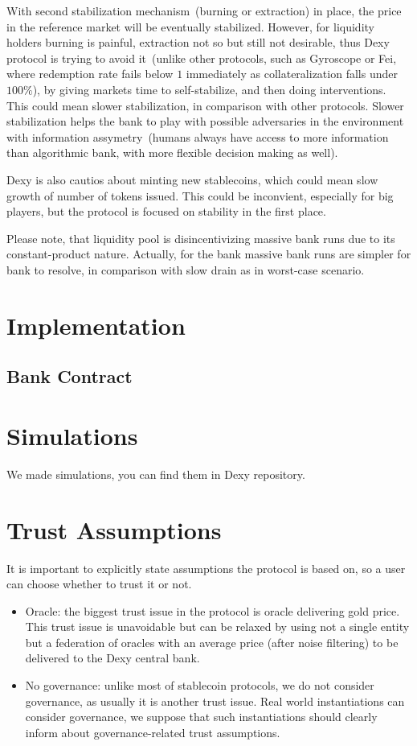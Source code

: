 \documentclass{article}   %
\newcommand{\authnote}[2]{\marginpar{\parbox{\marginparwidth}{\tiny %
  \textsf{#1 {\textcolor{blue}{notes: #2}}}}}%
  \textcolor{blue}{\textbf{\dag}}}
\newcommand{\authnote}[2]{
  \textsf{#1 \textcolor{blue}{: #2}}}
\newcommand{\authnote}[2]{}
\newcommand{\knote}[1]{{\authnote{\textcolor{green}{Alex notes}}{#1}}}
\newcommand{\sct}{stablecoin}
\newcommand{\dx}{Dexy}
\begin{document}
With second stabilization mechanism~(burning or extraction) in place, the price in the reference market will be eventually stabilized. However, for liquidity holders burning is painful, extraction not so but still not desirable, thus \dx{} protocol is trying to avoid it~(unlike other protocols, such as Gyroscope or Fei, where redemption rate fails below $1$ immediately as collateralization falls under $100\%$), by giving markets time to self-stabilize, and then doing interventions. This could mean slower stabilization, in comparison with other protocols. Slower stabilization helps the bank to play with possible adversaries in the environment with information assymetry~(humans always have access to more information than algorithmic bank, with more flexible decision making as well).

\dx{} is also cautios about minting new \sct{}s, which could mean slow growth of number of tokens issued. This could be inconvient, especially for big players, but the protocol is focused on stability in the first place. 

Please note, that liquidity pool is disincentivizing massive bank runs due to its constant-product nature. Actually, for the bank massive bank runs are simpler for bank to resolve, in comparison with slow drain as in worst-case scenario. 
 

\section{Implementation}

\subsection{Bank Contract}
\knote{put contracts here}

\section{Simulations}
We made simulations, you can find them in \dx{} repository. \knote{finish}

\section{Trust Assumptions}

It is important to explicitly state assumptions the protocol is based on, so a user can choose whether to trust it or not.

\begin{itemize}
  \item{Oracle: } the biggest trust issue in the protocol is oracle delivering gold price. This trust issue is unavoidable but can be relaxed by using not a single entity but a federation of oracles with an average price (after noise filtering) to be delivered to the Dexy central bank.
  \item{No governance: } unlike most of stablecoin protocols, we do not consider governance, as usually it is another trust issue. Real world instantiations can consider governance, we suppose that such instantiations should clearly inform about governance-related trust assumptions.
\end{itemize} 
\end{document}

